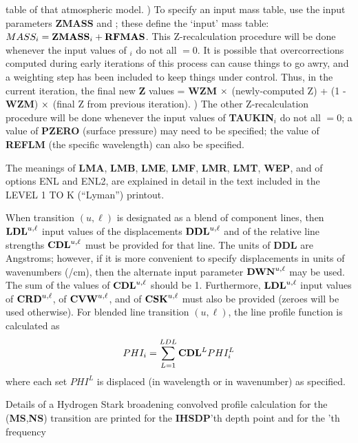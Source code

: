 table of that atmospheric model. \np
{}) To specify an input mass table, use the input parameters {\bf ZMASS}
and ; these define the `input' mass table:
$MASS_i = {\bf ZMASS}_i + {\bf RFMAS}$. This Z-recalculation procedure
will be done whenever the input values of $_i$ do not
all $= 0$. It is possible that overcorrections
computed during early iterations of this process can cause things
to go awry, and a weighting step has been included to keep things
under control. Thus, in the current iteration, the final new {\bf Z}
values = {\bf WZM} $\times$ (newly-computed Z) + (1 - {\bf WZM}) $\times$
(final Z from previous iteration).  \np
{}) The other Z-recalculation procedure will be done whenever the
input values of {\bf TAUKIN}$_i$ do not all $= 0$; a value of {\bf PZERO}
(surface pressure) may need to be specified; the value of
{\bf REFLM} (the specific wavelength) can also be specified.
\ej
\centerline{}
\space \noindent
The meanings of {\bf LMA}, {\bf LMB}, {\bf LME}, {\bf LMF}, {\bf LMR},
{\bf LMT}, {\bf WEP}, and of options ENL and ENL2, are 
explained in detail in the text included in the \break
LEVEL 1 TO K (\ie ``Lyman'') printout.
\blankline
\blankline
\centerline{}
\space \noindent
When transition $(u,\ell)$ is designated as a blend of component lines,
then ${\bf LDL}^{u,\ell}$ input values of the displacements ${\bf DDL}^{u,\ell}$
and of the relative line strengths \break
${\bf CDL}^{u,\ell}$ must be provided for
that line. The units of {\bf DDL} are Angstroms; however, if it is more
convenient to specify displacements in units of wavenumbers (/cm), 
then the alternate input parameter ${\bf DWN}^{u,\ell}$ may be used. 
The sum of the values of ${\bf CDL}^{u,\ell}$ should be 1. 
Furthermore, ${\bf LDL}^{u,\ell}$ input values
of ${\bf CRD}^{u,\ell}$, of ${\bf CVW}^{u,\ell}$, and of ${\bf CSK}^{u,\ell}$
must also be provided (zeroes will be used otherwise). \np
For blended line transition $(u,\ell)$, the line profile function
is calculated as
%
$$ PHI_i = \sum_{L=1}^{LDL} {\bf CDL}^L PHI^L_i $$
%
where each set $PHI^L$ is displaced (in wavelength or in wavenumber)
as specified.
\blankline
\blankline
\centerline{}
\space \noindent
Details of a Hydrogen Stark broadening convolved profile calculation
for the \break ({\bf MS},{\bf NS}) transition are printed for the
{\bf IHSDP}'th depth point and for the 'th frequency
